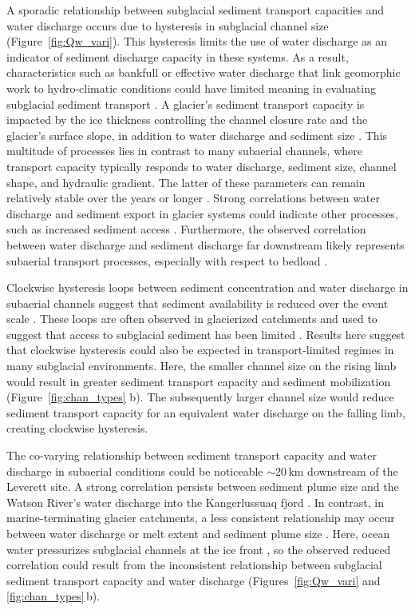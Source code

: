 \documentclass[tc, manuscript]{copernicus}
\begin{document}
A sporadic relationship between subglacial sediment transport capacities and water discharge occurs due to hysteresis in subglacial channel size (Figure~\ref{fig:Qw_vari}).
This hysteresis limits the use of water discharge as an indicator of sediment discharge capacity in these systems.
As a result, characteristics such as bankfull or effective water discharge that link geomorphic work to hydro-climatic conditions could have limited meaning in evaluating subglacial sediment transport \citep{wolman1960,lenzi2006}.
A glacier's sediment transport capacity is impacted by the ice thickness controlling the channel closure rate and the glacier's surface slope, in addition to water discharge and sediment size \citep[Figure~\ref{fig:multi_run}, Section~\ref{sect:sub_mode}; ][]{rothlisberger1972,gimbert2016,stevens2022,walder1994}.
This multitude of processes lies in contrast to many subaerial channels, where transport capacity typically responds to water discharge, sediment size, channel shape,  and hydraulic gradient.
The latter of these parameters can remain relatively stable over the years or longer \citep[Section~\ref{sect:fluv}; e.g.][]{tucker1997}.
Strong correlations between water discharge and sediment export in glacier systems could indicate other processes, such as increased sediment access \citep{zhang2022}.
Furthermore, the observed correlation between water discharge and sediment discharge far downstream likely represents subaerial transport processes, especially with respect to bedload \citep{mancini2023}.

Clockwise hysteresis loops between sediment concentration and water discharge in subaerial channels suggest that sediment availability is reduced over the event scale \citep[][]{williams1989}.
These loops are often observed in glacierized catchments and used to suggest that access to subglacial sediment has been limited \citep[e.g.][]{collins1979,willis1996,richards2003,stott2007,delaney2018}.
Results here suggest that clockwise hysteresis could also be expected in transport-limited regimes in many subglacial environments.
Here, the smaller channel size on the rising limb would result in greater sediment transport capacity and sediment mobilization (Figure~\ref{fig:chan_types} b).
The subsequently larger channel size would reduce sediment transport capacity for an equivalent water discharge on the falling limb, creating clockwise hysteresis.

The co-varying relationship between sediment transport capacity and water discharge in subaerial conditions could be noticeable $\sim20$\,\unit{km} downstream of the Leverett site.
A strong correlation persists between sediment plume size and the Watson River's water discharge into the Kangerlussuaq fjord \citep[Figure~\ref{fig:chan_types}\,c; ][]{chu2009,mcgrath2010}.
In contrast, in marine-terminating glacier catchments, a less consistent relationship may occur between water discharge or melt extent and sediment plume size \citep{chu2012,tedstone2012}.
Here, ocean water pressurizes subglacial channels at the ice front \citep[e.g.][]{how2017}, so the observed reduced correlation could result from the inconsistent relationship between subglacial sediment transport capacity and water discharge (Figures~\ref{fig:Qw_vari} and \ref{fig:chan_types}\,b).
\end{document}
